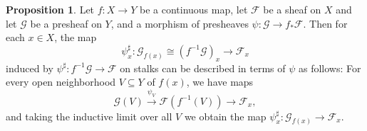 \documentclass[12pt,a4paper]{book}
\theoremstyle{definition}
\newtheorem{prop}[defn]{Proposition}
\begin{document}
\begin{prop}
    Let $f: X \rightarrow Y$ be a continuous map, let $\mathscr{F}$ be a sheaf on $X$ and let $\mathscr{G}$ be a presheaf on $Y$, and a morphism of presheaves $\psi: \mathscr{G} \rightarrow f_* \mathscr{F}$. Then for each $x \in X$, the map
    $$
        \psi_x^{\sharp}: \mathscr{G}_{f(x)} \cong \left(f^{-1} \mathscr{G}\right)_x \longrightarrow \mathscr{F}_x
    $$
    induced by $\psi^{\sharp}: f^{-1} \mathscr{G} \rightarrow \mathscr{F}$ on stalks can be described in terms of $\psi$ as follows:
    For every open neighborhood $V \subseteq Y$ of $f(x)$, we have maps
    $$
        \mathscr{G}(V) \xrightarrow{\psi_V} \mathscr{F}\left(f^{-1}(V)\right) \longrightarrow \mathscr{F}_x,
    $$
    and taking the inductive limit over all $V$ we obtain the map $\psi_x^{\sharp}: \mathscr{G}_{f(x)} \rightarrow \mathscr{F}_x$.
\end{prop}
\end{document}
